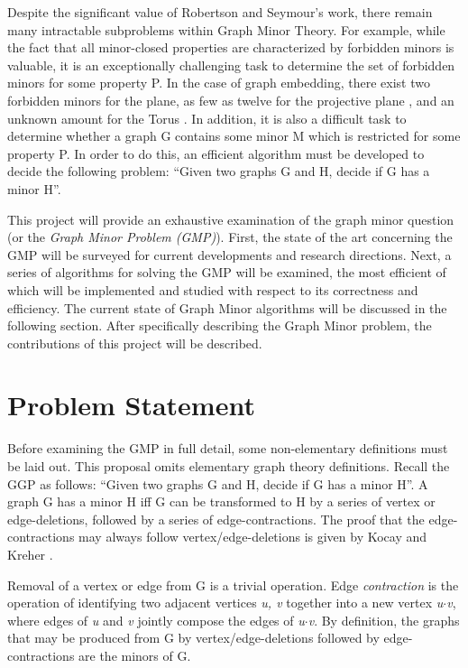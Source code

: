 \documentclass[12pt,conference]{IEEEtran}
\begin{document}
Despite the significant value of Robertson and Seymour's work, there remain many intractable subproblems within Graph Minor Theory. For example, while the fact that all minor-closed properties are characterized by forbidden minors is valuable, it is an exceptionally challenging task to determine the set of forbidden minors for some property P. In the case of graph embedding, there exist two forbidden minors for the plane, as few as twelve for the projective plane \cite{proj-plane-minors}, and an unknown amount for the Torus \cite{torus-minors}. In addition, it is also a difficult task to determine whether a graph G contains some minor M which is restricted for some property P. In order to do this, an efficient algorithm must be developed to decide the following problem: ``Given two graphs G and H, decide if G has a minor H''. 

This project will provide an exhaustive examination of the graph minor question (or the \textit{Graph Minor Problem (GMP)}). First, the state of the art concerning the GMP will be surveyed for current developments and research directions. Next, a series of algorithms for solving the GMP will be examined, the most efficient of which will be implemented and studied with respect to its correctness and efficiency. The current state of Graph Minor algorithms will be discussed in the following section. After specifically describing the Graph Minor problem, the contributions of this project will be described.

\section{Problem Statement}

Before examining the GMP in full detail, some non-elementary definitions must be laid out. This proposal omits elementary graph theory definitions. Recall the GGP as follows: ``Given two graphs G and H, decide if G has a minor H''. A graph G has a minor H iff G can be transformed to H by a series of vertex or edge-deletions, followed by a series of edge-contractions. The proof that the edge-contractions may always follow vertex/edge-deletions is given by Kocay and Kreher \cite{gao}. 

Removal of a vertex or edge from G is a trivial operation. Edge \textit{contraction} is the operation of identifying two adjacent vertices \textit{u, v} together into a new vertex \textit{u$\cdotp$v}, where edges of \textit{u} and \textit{v} jointly compose the edges of \textit{u$\cdotp$v}. By definition, the graphs that may be produced from G by vertex/edge-deletions followed by edge-contractions are the minors of G. 
\end{document}
